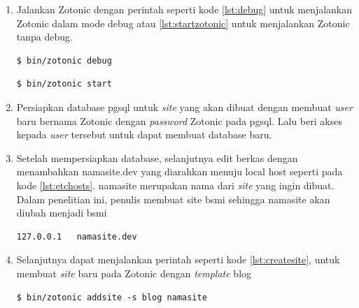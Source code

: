 \begin{enumerate}
	\item Jalankan Zotonic dengan perintah seperti kode \ref{lst:debug} untuk menjalankan Zotonic dalam mode debug atau \ref{lst:startzotonic} untuk menjalankan Zotonic tanpa debug.
	
	\begin{minipage}{\linewidth}
		\begin{lstlisting}[caption={Perintah untuk menjalankan Zotonic pada mode \textit{debug}},label={lst:debug}]
		$ bin/zotonic debug
		\end{lstlisting}
	\end{minipage}

	\begin{minipage}{\linewidth}
		\begin{lstlisting}[caption={Perintah untuk menjalankan Zotonic tanpa mode \textit{debug}},label={lst:startzotonic}]
		$ bin/zotonic start
		\end{lstlisting}
	\end{minipage}

	\item Persiapkan database pgsql untuk \textit{site} yang akan dibuat dengan membuat \textit{user} baru bernama Zotonic dengan \textit{password} Zotonic pada pgsql. Lalu beri akses kepada \textit{user} tersebut untuk dapat membuat database baru.
	
	\item Setelah mempersiapkan database, selanjutnya edit berkas  dengan menambahkan namasite.dev yang diarahkan menuju local host seperti pada kode \ref{lst:etchosts}. namasite merupakan nama dari \textit{site} yang ingin dibuat. Dalam penelitian ini, penulis membuat site bsmi sehingga namasite akan diubah menjadi bsmi
	\begin{minipage}{\linewidth}
		\begin{lstlisting}[caption={Configurasi berkas /etc/hosts},label={lst:etchosts}]
		127.0.0.1   namasite.dev
		\end{lstlisting}
	\end{minipage}

	\item Selanjutnya dapat menjalankan perintah seperti kode \ref{lst:createsite}, untuk membuat \textit{site} baru pada Zotonic dengan \textit{template} blog
	\begin{minipage}{\linewidth}
		\begin{lstlisting}[caption={Perintah untuk membuat \textit{site} baru pada Zotonic},label={lst:createsite}]
		$ bin/zotonic addsite -s blog namasite
		\end{lstlisting}
	\end{minipage}


\end{enumerate}
